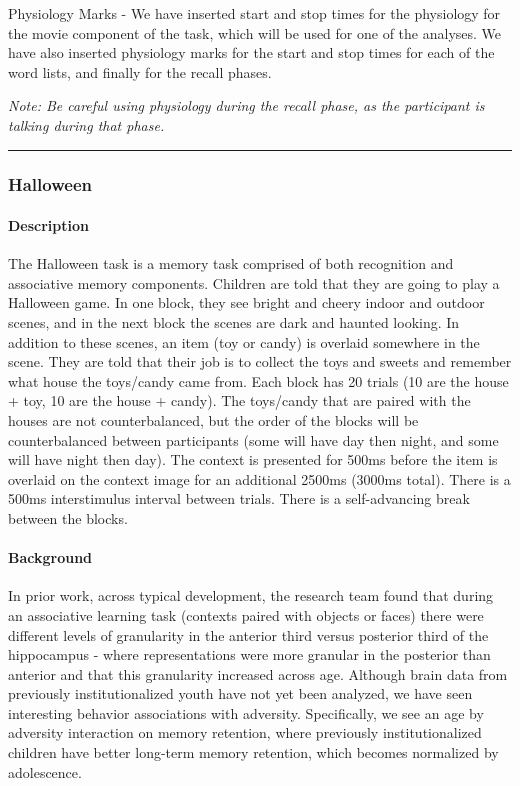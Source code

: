 \documentclass[
]{book}
\begin{document}
Physiology Marks - We have inserted start and stop times for the physiology for the movie component of the task, which will be used for one of the analyses. We have also inserted physiology marks for the start and stop times for each of the word lists, and finally for the recall phases.

\emph{Note: Be careful using physiology during the recall phase, as the participant is talking during that phase.}

\begin{center}\rule{0.5\linewidth}{0.5pt}\end{center}

\hypertarget{halloween}{%
\subsubsection{Halloween}\label{halloween}}

\hypertarget{description-2}{%
\paragraph{Description}\label{description-2}}

The Halloween task is a memory task comprised of both recognition and associative memory components. Children are told that they are going to play a Halloween game. In one block, they see bright and cheery indoor and outdoor scenes, and in the next block the scenes are dark and haunted looking. In addition to these scenes, an item (toy or candy) is overlaid somewhere in the scene. They are told that their job is to collect the toys and sweets and remember what house the toys/candy came from. Each block has 20 trials (10 are the house + toy, 10 are the house + candy). The toys/candy that are paired with the houses are not counterbalanced, but the order of the blocks will be counterbalanced between participants (some will have day then night, and some will have night then day). The context is presented for 500ms before the item is overlaid on the context image for an additional 2500ms (3000ms total). There is a 500ms interstimulus interval between trials. There is a self-advancing break between the blocks.

\hypertarget{background-1}{%
\paragraph{Background}\label{background-1}}

In prior work, across typical development, the research team found that during an associative learning task (contexts paired with objects or faces) there were different levels of granularity in the anterior third versus posterior third of the hippocampus - where representations were more granular in the posterior than anterior and that this granularity increased across age. Although brain data from previously institutionalized youth have not yet been analyzed, we have seen interesting behavior associations with adversity. Specifically, we see an age by adversity interaction on memory retention, where previously institutionalized children have better long-term memory retention, which becomes normalized by adolescence.
\end{document}
